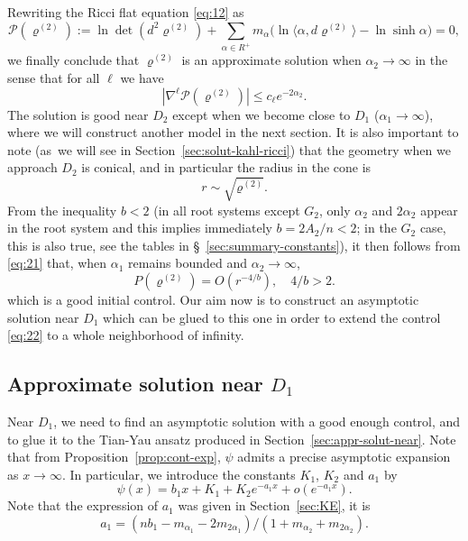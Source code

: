 \documentclass[JEP,XML,SOM,Unicode, NoEqCountersInSection, NoFloatCountersInSection]{cedram}
\theoremstyle{plain}
\theoremstyle{definition}
\newcommand{\rRoots}{R}
\newcommand{\opP}{\mathcal{P}}
\newcommand{\rhodeux}{\varrho^{(2)}}
\begin{document}
Rewriting the Ricci flat equation \eqref{eq:12} as
\begin{equation}
\label{eq:8}
\opP(\rhodeux) := \ln\det(d^2\rhodeux) + \sum_{\alpha\in \rRoots^+}m_\alpha \big( \ln \langle\alpha,d\rhodeux\rangle - \ln \sinh \alpha \big) = 0,
\end{equation}
we finally conclude that $\rhodeux$ is an approximate solution when $\alpha_2\to\infty$ in the sense that for all $\ell$ we have
\begin{equation}
\label{eq:21}
|\nabla^\ell \opP(\rhodeux)| \leq c_\ell e^{-2\alpha_2}.
\end{equation}
The solution is good near $D_2$ except when we become close to $D_1$ ($\alpha_1\to\infty$), where we will construct another model in the next section. It is also important to note (as~we will see in Section~\ref{sec:solut-kahl-ricci}) that the geometry when we approach $D_2$ is conical,
and in particular the radius in the cone is \[ r\sim\sqrt{\rhodeux}. \] From the inequality $b<2$ (in all root systems except $G_2$, only $\alpha_2$ and $2\alpha_2$ appear in the root system and this implies immediately $b=2A_2/n<2$; in the $G_2$ case, this is also true, see the tables in §~\ref{sec:summary-constants}), it then follows from \eqref{eq:21} that, when $\alpha_1$ remains bounded and $\alpha_2\to\infty$,
\begin{equation}
\label{eq:22}
P(\rhodeux) = O(r^{-4/b}), \quad4/b > 2.
\end{equation}
which is a good initial control. Our aim now is to construct an asymptotic solution near $D_1$ which can be glued to this one in order to extend the control \eqref{eq:22} to a whole neighborhood of infinity.

\subsection{Approximate solution near $D_1$}

Near $D_1$, we need to find an asymptotic solution with a good enough
control, and to glue it to the Tian-Yau ansatz produced in
Section~\ref{sec:appr-solut-near}. Note that from
Proposition~\ref{prop:cont-exp}, $\psi$ admits a precise asymptotic
expansion as $x\to \infty$. In particular, we introduce the constants
$K_1$, $K_2$ and $a_1$ by
\begin{equation}
\psi(x)=b_1x+K_1+K_2e^{-a_1x}+o(e^{-a_1x}).
\end{equation}
Note that the expression of
$a_1$ was given in Section~\ref{sec:KE}, it is
$$a_1=(nb_1-m_{\alpha_1}-2m_{2\alpha_1})/(1+m_{\alpha_2}+m_{2\alpha_2}).$$
\end{document}
